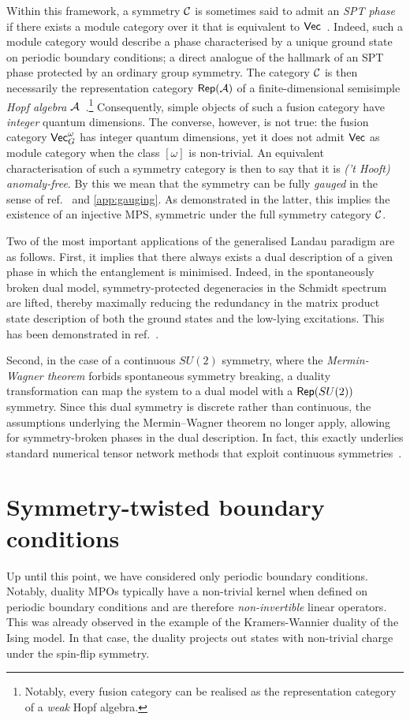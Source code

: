 Within this framework, a symmetry $\mathcal{C}$ is sometimes said to admit an \emph{SPT phase} if there exists a module category over it that is equivalent to $\mathsf{Vec}$~\cite{Thorngren2019,Fechisin2023,Inamura2024,Meng2024,Seifnashri2025}. Indeed, such a module category would describe a phase characterised by a unique ground state on periodic boundary conditions; a direct analogue of the hallmark of an SPT phase protected by an ordinary group symmetry. The category $\mathcal{C}$ is then necessarily the representation category $\mathsf{Rep}(\mathcal{A})$ of a finite-dimensional semisimple \emph{Hopf algebra} $\mathcal{A}$~\cite{Etingof2015}.\footnote{Notably, every fusion category can be realised as the representation category of a \emph{weak} Hopf algebra.} Consequently, simple objects of such a fusion category have \emph{integer} quantum dimensions. The converse, however, is not true: the fusion category $\mathsf{Vec}_G^\omega$ has integer quantum dimensions, yet it does not admit $\mathsf{Vec}$ as module category when the class $[\omega]$ is non-trivial. An equivalent characterisation of such a symmetry category is then to say that it is \emph{('t Hooft) anomaly-free}. By this we mean that the symmetry can be fully \emph{gauged} in the sense of ref.~\cite{Bhardwaj2017} and \cref{app:gauging}. As demonstrated in the latter, this implies the existence of an injective MPS, symmetric under the full symmetry category $\mathcal{C}$.

\bigskip\noindent Two of the most important applications of the generalised Landau paradigm are as follows. First, it implies that there always exists a dual description of a given phase in which the entanglement is minimised. Indeed, in the spontaneously broken dual model, symmetry-protected degeneracies in the Schmidt spectrum are lifted, thereby maximally reducing the redundancy in the matrix product state description of both the ground states and the low-lying excitations. This has been demonstrated in ref.~\cite{Lootens2024}.

Second, in the case of a continuous $SU(2)$ symmetry, where the \emph{Mermin-Wagner theorem} forbids spontaneous symmetry breaking, a duality transformation can map the system to a dual model with a $\mathsf{Rep}(SU(2))$ symmetry. Since this dual symmetry is discrete rather than continuous, the assumptions underlying the Mermin–Wagner theorem no longer apply, allowing for symmetry-broken phases in the dual description. In fact, this exactly underlies standard numerical tensor network methods that exploit continuous symmetries~\cite{Singh2009,Devos2025,Lootens2024}.
\section{Symmetry-twisted boundary conditions}\label{sec:SymTwist}
Up until this point, we have considered only periodic boundary conditions. Notably, duality MPOs typically have a non-trivial kernel when defined on periodic boundary conditions and are therefore \emph{non-invertible} linear operators. This was already observed in the example of the Kramers-Wannier duality of the Ising model. In that case, the duality projects out states with non-trivial charge under the spin-flip symmetry.

